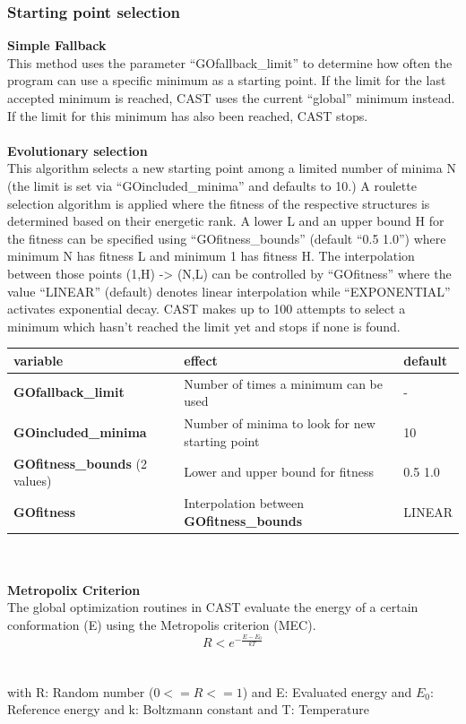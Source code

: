 \documentclass[10pt,a4paper]{article} %
\begin{document}
	\subsubsection{Starting point selection}
	\textbf{Simple Fallback} \\
	This method uses the parameter ``GOfallback\_limit'' to determine how often the program can use a specific minimum as a starting point. If the limit for the last accepted minimum is reached, \ac{CAST} uses the current ``global'' minimum instead. If the limit for this minimum has also been reached, \ac{CAST} stops.\\~\\
		
	\textbf{Evolutionary selection} \\
	This algorithm selects a new starting point among a limited number of minima N (the limit is set via ``GOincluded\_minima'' and defaults to 10.)
	A roulette selection algorithm is applied where the fitness of the respective structures is determined based on their energetic rank. A lower L and an upper bound H for the fitness can be specified using ``GOfitness\_bounds'' (default ``0.5 1.0'') where minimum N has fitness L and minimum 1 has fitness H.
	The interpolation between those points (1,H) -> (N,L) can be controlled by ``GOfitness'' where the value ``LINEAR'' (default) denotes linear interpolation while ``EXPONENTIAL'' activates exponential decay.
	\ac{CAST} makes up to 100 attempts to select a minimum which hasn't reached the limit yet and stops if none is found.
	
	\begin{tabularx}{\textwidth}{l|X|X}
	variable & effect & default \\
		\hline
		\textbf{GOfallback\_limit} & Number of times a minimum can be used & - \\
		\textbf{GOincluded\_minima} & Number of minima to look for new starting point & 10 \\
		\textbf{GOfitness\_bounds} (2 values) & Lower and upper bound for fitness & 0.5 1.0 \\
		\textbf{GOfitness} & Interpolation between \textbf{GOfitness\_bounds} & LINEAR \\
	\end{tabularx}
	\\~\\

	\textbf{Metropolix Criterion} \\
	The global optimization routines in \ac{CAST} evaluate the energy of a certain conformation (E) using the Metropolis criterion (MEC).
	\begin{equation}
	R < e^{-\frac{E-E_0}{kT}}
	\end{equation}
	\\~\\
	with R: Random number ($0 <= R <= 1$)
	and E: Evaluated energy
	and $E_0$: Reference energy
	and k: Boltzmann constant
	and T: Temperature\\~\\
	
\end{document}
